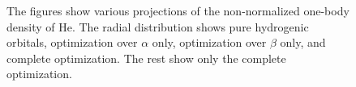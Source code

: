 \documentclass[aps,prc,twocolumn,floatfix]{revtex4}
\begin{document}
\begin{figure}[ht]
\caption[Optional caption for list of figures]{The figures show various projections of the non-normalized one-body density of He. The radial distribution shows pure hydrogenic orbitals, optimization over $\alpha$ only, optimization over $\beta$ only, and complete optimization. The rest show only the complete optimization.}
\label{fig:6}
\end{figure}
\end{document}
